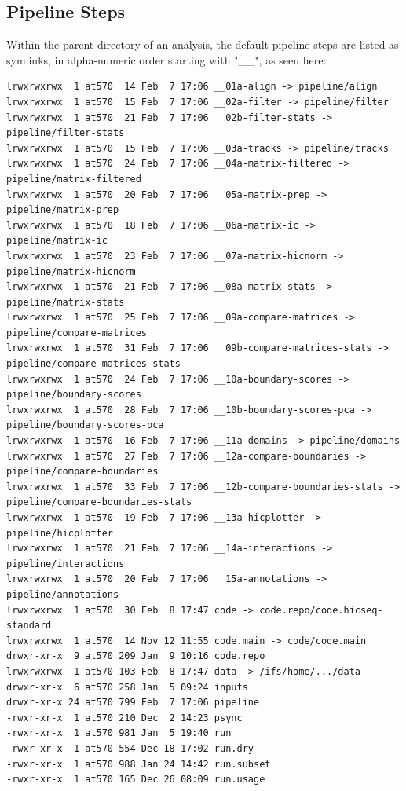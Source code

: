 \subsection{Pipeline Steps}\label{HiC:index} %
Within the parent directory of an analysis, the default pipeline steps are listed as symlinks, in alpha-numeric order starting with "\_\_", as seen here:


\begin{lstlisting}
lrwxrwxrwx  1 at570  14 Feb  7 17:06 __01a-align -> pipeline/align
lrwxrwxrwx  1 at570  15 Feb  7 17:06 __02a-filter -> pipeline/filter
lrwxrwxrwx  1 at570  21 Feb  7 17:06 __02b-filter-stats -> pipeline/filter-stats
lrwxrwxrwx  1 at570  15 Feb  7 17:06 __03a-tracks -> pipeline/tracks
lrwxrwxrwx  1 at570  24 Feb  7 17:06 __04a-matrix-filtered -> pipeline/matrix-filtered
lrwxrwxrwx  1 at570  20 Feb  7 17:06 __05a-matrix-prep -> pipeline/matrix-prep
lrwxrwxrwx  1 at570  18 Feb  7 17:06 __06a-matrix-ic -> pipeline/matrix-ic
lrwxrwxrwx  1 at570  23 Feb  7 17:06 __07a-matrix-hicnorm -> pipeline/matrix-hicnorm
lrwxrwxrwx  1 at570  21 Feb  7 17:06 __08a-matrix-stats -> pipeline/matrix-stats
lrwxrwxrwx  1 at570  25 Feb  7 17:06 __09a-compare-matrices -> pipeline/compare-matrices
lrwxrwxrwx  1 at570  31 Feb  7 17:06 __09b-compare-matrices-stats -> pipeline/compare-matrices-stats
lrwxrwxrwx  1 at570  24 Feb  7 17:06 __10a-boundary-scores -> pipeline/boundary-scores
lrwxrwxrwx  1 at570  28 Feb  7 17:06 __10b-boundary-scores-pca -> pipeline/boundary-scores-pca
lrwxrwxrwx  1 at570  16 Feb  7 17:06 __11a-domains -> pipeline/domains
lrwxrwxrwx  1 at570  27 Feb  7 17:06 __12a-compare-boundaries -> pipeline/compare-boundaries
lrwxrwxrwx  1 at570  33 Feb  7 17:06 __12b-compare-boundaries-stats -> pipeline/compare-boundaries-stats
lrwxrwxrwx  1 at570  19 Feb  7 17:06 __13a-hicplotter -> pipeline/hicplotter
lrwxrwxrwx  1 at570  21 Feb  7 17:06 __14a-interactions -> pipeline/interactions
lrwxrwxrwx  1 at570  20 Feb  7 17:06 __15a-annotations -> pipeline/annotations
lrwxrwxrwx  1 at570  30 Feb  8 17:47 code -> code.repo/code.hicseq-standard
lrwxrwxrwx  1 at570  14 Nov 12 11:55 code.main -> code/code.main
drwxr-xr-x  9 at570 209 Jan  9 10:16 code.repo
lrwxrwxrwx  1 at570 103 Feb  8 17:47 data -> /ifs/home/.../data
drwxr-xr-x  6 at570 258 Jan  5 09:24 inputs
drwxr-xr-x 24 at570 799 Feb  7 17:06 pipeline
-rwxr-xr-x  1 at570 210 Dec  2 14:23 psync
-rwxr-xr-x  1 at570 981 Jan  5 19:40 run
-rwxr-xr-x  1 at570 554 Dec 18 17:02 run.dry
-rwxr-xr-x  1 at570 988 Jan 24 14:42 run.subset
-rwxr-xr-x  1 at570 165 Dec 26 08:09 run.usage
\end{lstlisting}

